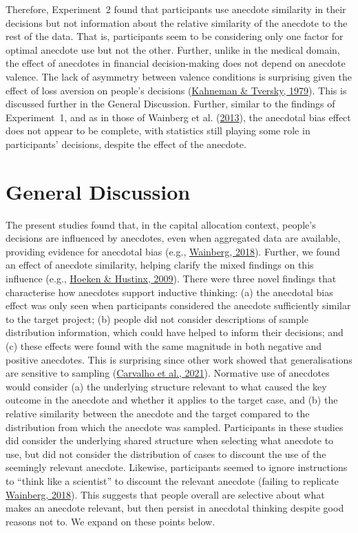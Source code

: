 \documentclass[
  man, donotrepeattitle,floatsintext]{apa7}
\theoremstyle{definition}
\theoremstyle{definition}
\theoremstyle{definition}
\theoremstyle{definition}
\theoremstyle{remark}
\begin{document}
Therefore, Experiment~2 found that participants use anecdote similarity in their
decisions but not information about the relative similarity of the anecdote to
the rest of the data. That is, participants seem to be considering only one
factor for optimal anecdote use but not the other. Further, unlike in the
medical domain, the effect of anecdotes in financial decision-making does not
depend on anecdote valence. The lack of asymmetry between valence conditions is
surprising given the effect of loss aversion on people's decisions
(\protect\hyperlink{ref-kahneman1979}{Kahneman \& Tversky, 1979}). This is discussed further in the General Discussion. Further,
similar to the findings of Experiment~1, and as in those of Wainberg et al. (\protect\hyperlink{ref-wainberg2013}{2013}), the
anecdotal bias effect does not appear to be complete, with statistics still
playing some role in participants' decisions, despite the effect of the
anecdote.

\hypertarget{general-discussion}{%
\section{General Discussion}\label{general-discussion}}

The present studies found that, in the capital allocation context, people's
decisions are influenced by anecdotes, even when aggregated data are available,
providing evidence for anecdotal bias (e.g., \protect\hyperlink{ref-wainberg2018}{Wainberg, 2018}). Further, we found
an effect of anecdote similarity, helping clarify the mixed findings on this
influence (e.g., \protect\hyperlink{ref-hoeken2009}{Hoeken \& Hustinx, 2009}). There were three novel findings that characterise
how anecdotes support inductive thinking: (a) the anecdotal bias effect was only
seen when participants considered the anecdote sufficiently similar to the
target project; (b) people did not consider descriptions of sample distribution
information, which could have helped to inform their decisions; and (c) these
effects were found with the same magnitude in both negative and positive
anecdotes. This is surprising since other work showed that generalisations are
sensitive to sampling (\protect\hyperlink{ref-carvalho2021}{Carvalho et al., 2021}). Normative use of anecdotes would consider
(a) the underlying structure relevant to what caused the key outcome in the
anecdote and whether it applies to the target case, and (b) the relative
similarity between the anecdote and the target compared to the distribution from
which the anecdote was sampled. Participants in these studies did consider the
underlying shared structure when selecting what anecdote to use, but did not
consider the distribution of cases to discount the use of the seemingly relevant
anecdote. Likewise, participants seemed to ignore instructions to ``think like a
scientist'' to discount the relevant anecdote (failing to replicate \protect\hyperlink{ref-wainberg2018}{Wainberg, 2018}). This suggests that people overall are selective about what makes
an anecdote relevant, but then persist in anecdotal thinking despite good
reasons not to. We expand on these points below.
\end{document}
